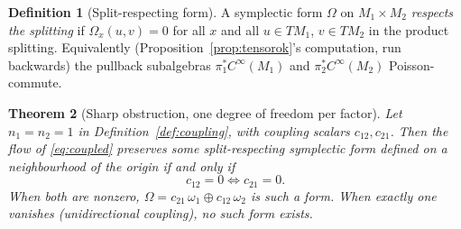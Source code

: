 \documentclass[10pt,a4paper]{article}
\theoremstyle{plain}
\newtheorem{theorem}{Theorem}
\theoremstyle{definition}
\newtheorem{definition}[theorem]{Definition}
\newcommand{\Cinf}{C^{\infty}}
\begin{document}
\begin{definition}[Split-respecting form]
\label{def:split}
A symplectic form $\Omega$ on $M_1\times M_2$ \emph{respects the splitting} if $\Omega_x(u,v) = 0$ for all $x$ and all $u \in T M_1$, $v \in TM_2$ in the product splitting. Equivalently (Proposition~\ref{prop:tensorok}'s computation, run backwards) the pullback subalgebras $\pi_1^*\Cinf(M_1)$ and $\pi_2^*\Cinf(M_2)$ Poisson-commute.
\end{definition}

\begin{theorem}[Sharp obstruction, one degree of freedom per factor]
\label{thm:splitobstruction}
Let $n_1 = n_2 = 1$ in Definition~\ref{def:coupling}, with coupling scalars $c_{12},c_{21}$. Then the flow of \eqref{eq:coupled} preserves some split-respecting symplectic form defined on a neighbourhood of the origin if and only if
\[
c_{12} = 0 \iff c_{21} = 0 .
\]
When both are nonzero, $\Omega = c_{21}\,\omega_1\oplus c_{12}\,\omega_2$ is such a form. When exactly one vanishes (unidirectional coupling), no such form exists.
\end{theorem}
\end{document}
